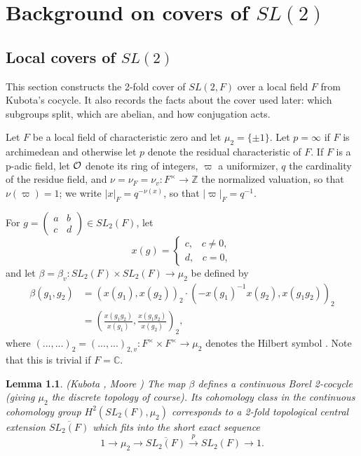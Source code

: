 \documentclass[12pt,letterpaper]{book}
\theoremstyle{plain}
\newtheorem{lemma}[theorem]{Lemma}
\theoremstyle{definition}
\theoremstyle{remark}
\theoremstyle{remark}
\begin{document}
\chapter{Background on covers of \texorpdfstring{$SL(2)$}{SL(2)}}\label{ch:background}

\section{Local covers of \texorpdfstring{$SL(2)$}{SL(2)}}\label{sec:local}

This section constructs the 2-fold cover of $SL(2,F)$ over a local field $F$ from Kubota's cocycle. It also records the facts about the cover used later: which subgroups split, which are abelian, and how conjugation acts.


Let $F$ be a local field of characteristic zero and let $\mu_2=\{\pm 1\}$.
Let $p=\infty$ if $F$ is archimedean and otherwise
let $p$ denote the residual characteristic of $F$.
If $F$ is a p-adic field, let ${\cal O}$ denote its ring of integers,
$\varpi$ a uniformizer, $q$ the cardinality of the residue field, and
$\nu =\nu _F=\nu _v:F^{\times }\rightarrow {\mathbb{Z}}$ the
normalized valuation, so that $\nu (\varpi )=1$; we write
$|x|_F=q^{-\nu(x)}$, so that $|\varpi|_F=q^{-1}$.


For $g=\left(
\begin{array}{cc}
a & b \\
c & d
\end{array}
\right) \in SL_2(F)$, let
\[
x(g)=\left\{
\begin{array}{c}
c,\;\;\;c\neq 0, \\
d,\;\;\;c=0,
\end{array}
\right.
\]
and let $\beta =\beta _v:SL_2(F)\times SL_2(F)\rightarrow \mu _2$ be defined
by
\begin{align}
\beta (g_1,g_2) &=(x(g_1),x(g_2))_2\cdot (-x(g_1)^{-1}x(g_2),x(g_1g_2))_2 \label{eq:beta}\\
&=(\frac{x(g_1g_2)}{x(g_1)},\frac{x(g_1g_2)}{x(g_2)})_2,  \nonumber
\end{align}
where $(...,...)_2=(...,...)_{2,v}:F^{\times }
\times F^{\times }\rightarrow \mu _2$
denotes the Hilbert symbol \cite{W1}.
Note that this is trivial if $F={\mathbb {C}}$.

\begin{lemma}\label{lem:kubota}
(Kubota \cite{K1}, Moore \cite{M})
The map $\beta $ defines a continuous Borel
2-cocycle (giving $\mu _2$ the discrete topology of course). Its cohomology
class in the continuous cohomology group $H^2(SL_2(F),\mu _2)$ corresponds
to a 2-fold topological central extension $\overline{SL_2(F)}$ which fits
into the short exact sequence
\[
1\rightarrow \mu _2\rightarrow \overline{SL_2(F)}\stackrel{p}{\rightarrow }%
SL_2(F)\rightarrow 1.
\]
\end{lemma}
\end{document}
